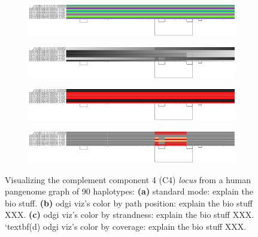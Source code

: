 \begin{figure}[h!]
    \begin{subfigure}{\linewidth}
        \caption{}
        \centering
        \includegraphics[width=1.0\linewidth, trim=0 +2cm 0 0]{fig/visualization_1D/chr6.pan.fa.a2fb268.e820cd3.9ea71d8.smooth.gfa.og.grch38_chr6_31889244-32095493.0.sorted}
        \label{fig:odgi_viz_default}
    \end{subfigure}
    \begin{subfigure}{\linewidth}
        \caption{}
        \centering
        \includegraphics[width=1.0\linewidth, trim=0 +2cm 0 0]{fig/visualization_1D/chr6.pan.fa.a2fb268.e820cd3.9ea71d8.smooth.gfa.og.grch38_chr6_31889244-32095493.0.sorted.du}
        \label{fig:odgi_viz_color_by_path_pos}
    \end{subfigure}
    \begin{subfigure}{\linewidth}
        \caption{}
        \centering
        \includegraphics[width=\linewidth, trim=0 +2cm 0 0]{fig/visualization_1D/chr6.pan.fa.a2fb268.e820cd3.9ea71d8.smooth.gfa.og.grch38_chr6_31889244-32095493.0.sorted.z}
        \label{fig:odgi_viz_color_by_inversion_rate}
    \end{subfigure}
    \begin{subfigure}{1\linewidth}
        \caption{}
        \centering
        \includegraphics[width=\linewidth, trim=0 0 0 0]{fig/visualization_1D/chr6.pan.fa.a2fb268.e820cd3.9ea71d8.smooth.gfa.og.grch38_chr6_31889244-32095493.0.sorted.m}
        \label{fig:odgi_viz_color_by_path_depth}
    \end{subfigure}
    \caption{Visualizing the complement component 4 (C4) \textit{locus} from a human pangenome graph of 90 haplotypes: \textbf{(a)} standard mode: explain the bio stuff. \textbf{(b)} odgi viz's color by path position: explain the bio stuff XXX. \textbf{(c)} odgi viz's color by strandness: explain the bio stuff XXX. `textbf{(d)}  odgi viz's color by coverage: explain the bio stuff XXX.}
    \label{fig:odgi_viz}
\end{figure}
